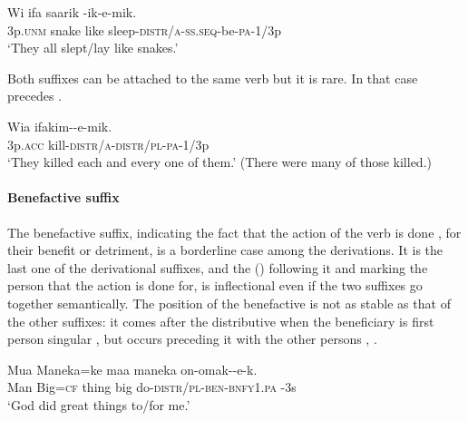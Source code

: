 \ea%
\label{ex:3:x208}
\gll Wi ifa saarik -ik-e-mik. \\
3p.\textsc{unm} snake like sleep-\textsc{distr}/\textsc{a}-\textsc{ss}.\textsc{seq}-be-\textsc{pa}-1/3p \\
\glt`They all slept/lay like snakes.'
\z

Both suffixes can be attached to the same verb but it is rare. In that case \textstyleEmphasizedVernacularWords{\nobreakdash-} precedes \textstyleEmphasizedVernacularWords{\nobreakdash-}.

\ea%
\label{ex:3:x206}
\gll Wia ifakim--e-mik. \\
3p.\textsc{acc} kill-\textsc{distr}/\textsc{a}-\textsc{distr}/\textsc{pl}-\textsc{pa}-1/3p \\
\glt`They killed each and every one of them.' (There were many of those killed.) 
\z

\paragraph{Benefactive suffix} \label{sec:3:a:z:y:x}
{}
The benefactive suffix, indicating the fact that the action of the verb is done , for their benefit or detriment, is a borderline case among the derivations. It is the last one of the derivational suffixes, and the  () following it and marking the person that the action is done for, is inflectional even if the two suffixes go together semantically. The position of the benefactive is not as stable as that of the other suffixes: it comes after the distributive when the beneficiary is first person singular ,  but occurs preceding it with the other persons , . 

\ea%
\label{ex:3:x210}
\gll Mua Maneka=ke maa maneka on-omak--e-k. \\
Man Big=\textsc{cf} thing big do-\textsc{distr}/\textsc{pl}-\textsc{ben}-\textsc{bnfy}1.\textsc{pa}{\footnotemark} -3s \\
\glt`God did great things to/for me.'
\z
{}

